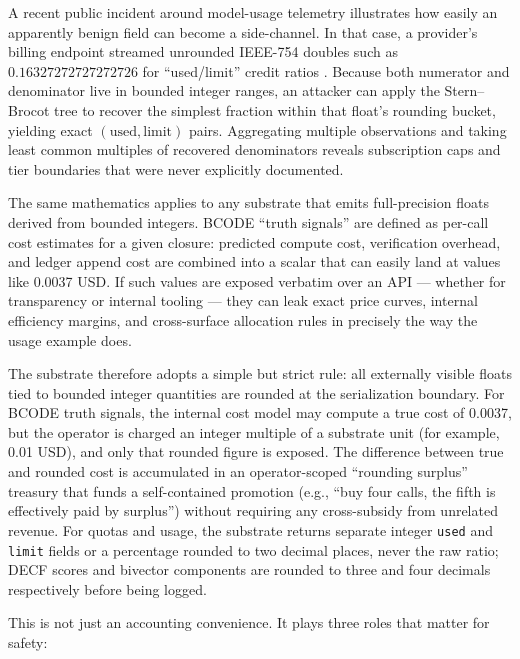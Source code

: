 \documentclass{article}
\begin{document}
A recent public incident around model-usage telemetry illustrates how
easily an apparently benign field can become a side-channel. In that
case, a provider's billing endpoint streamed unrounded IEEE-754 doubles
such as \(0.16327272727272726\) for ``used/limit'' credit ratios
\citep{katsarosgiannis2026}. Because both numerator and denominator live
in bounded integer ranges, an attacker can apply the Stern--Brocot tree
to recover the simplest fraction within that float's rounding bucket,
yielding exact \((\text{used},\text{limit})\) pairs. Aggregating
multiple observations and taking least common multiples of recovered
denominators reveals subscription caps and tier boundaries that were
never explicitly documented.

The same mathematics applies to any substrate that emits full-precision
floats derived from bounded integers. BCODE ``truth signals'' are
defined as per-call cost estimates for a given closure: predicted
compute cost, verification overhead, and ledger append cost are combined
into a scalar that can easily land at values like 0.0037 USD. If such
values are exposed verbatim over an API --- whether for transparency or
internal tooling --- they can leak exact price curves, internal
efficiency margins, and cross-surface allocation rules in precisely the
way the usage example does.

The substrate therefore adopts a simple but strict rule: all externally
visible floats tied to bounded integer quantities are rounded at the
serialization boundary. For BCODE truth signals, the internal cost model
may compute a true cost of 0.0037, but the operator is charged an
integer multiple of a substrate unit (for example, 0.01 USD), and only
that rounded figure is exposed. The difference between true and rounded
cost is accumulated in an operator-scoped ``rounding surplus'' treasury
that funds a self-contained promotion (e.g., ``buy four calls, the fifth
is effectively paid by surplus'') without requiring any cross-subsidy
from unrelated revenue. For quotas and usage, the substrate returns
separate integer \texttt{used} and \texttt{limit} fields or a percentage
rounded to two decimal places, never the raw ratio; DECF scores and
bivector components are rounded to three and four decimals respectively
before being logged.

This is not just an accounting convenience. It plays three roles that
matter for safety:
\end{document}
